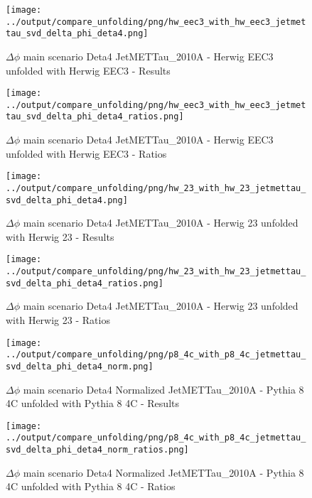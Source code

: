 \documentclass[11pt]{book}
\begin{document}
\begin{figure}[ht]
\centering
\texttt{[image: ../output/compare\_unfolding/png/hw\_eec3\_with\_hw\_eec3\_jetmettau\_svd\_delta\_phi\_deta4.png]}
\caption{$\Delta\phi$ main scenario Deta4 JetMETTau\_2010A - Herwig EEC3 unfolded with Herwig EEC3 - Results}
\label{hw_eec3_hw_eec3_jetmettau_svd_delta_phi_deta4_a}
\end{figure}

\begin{figure}[ht]
\centering
\texttt{[image: ../output/compare\_unfolding/png/hw\_eec3\_with\_hw\_eec3\_jetmettau\_svd\_delta\_phi\_deta4\_ratios.png]}
\caption{$\Delta\phi$ main scenario Deta4 JetMETTau\_2010A - Herwig EEC3 unfolded with Herwig EEC3 - Ratios}
\label{hw_eec3_hw_eec3_jetmettau_svd_delta_phi_deta4_b}
\end{figure}

\begin{figure}[ht]
\centering
\texttt{[image: ../output/compare\_unfolding/png/hw\_23\_with\_hw\_23\_jetmettau\_svd\_delta\_phi\_deta4.png]}
\caption{$\Delta\phi$ main scenario Deta4 JetMETTau\_2010A - Herwig 23 unfolded with Herwig 23 - Results}
\label{hw_23_hw_23_jetmettau_svd_delta_phi_deta4_a}
\end{figure}

\begin{figure}[ht]
\centering
\texttt{[image: ../output/compare\_unfolding/png/hw\_23\_with\_hw\_23\_jetmettau\_svd\_delta\_phi\_deta4\_ratios.png]}
\caption{$\Delta\phi$ main scenario Deta4 JetMETTau\_2010A - Herwig 23 unfolded with Herwig 23 - Ratios}
\label{hw_23_hw_23_jetmettau_svd_delta_phi_deta4_b}
\end{figure}



\begin{figure}[ht]
\centering
\texttt{[image: ../output/compare\_unfolding/png/p8\_4c\_with\_p8\_4c\_jetmettau\_svd\_delta\_phi\_deta4\_norm.png]}
\caption{$\Delta\phi$ main scenario Deta4 Normalized JetMETTau\_2010A - Pythia 8 4C unfolded with Pythia 8 4C - Results}
\label{p8_p8_jetmettau_svd_delta_phi_deta4_norm_a}
\end{figure}

\begin{figure}[ht]
\centering
\texttt{[image: ../output/compare\_unfolding/png/p8\_4c\_with\_p8\_4c\_jetmettau\_svd\_delta\_phi\_deta4\_norm\_ratios.png]}
\caption{$\Delta\phi$ main scenario Deta4 Normalized JetMETTau\_2010A - Pythia 8 4C unfolded with Pythia 8 4C - Ratios}
\label{p8_p8_jetmettau_svd_delta_phi_deta4_norm_b}
\end{figure}
\end{document}
